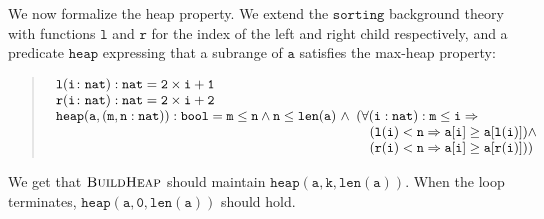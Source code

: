\documentclass[english,submission]{eptcs}
\begin{document}
We now formalize the heap property. We extend the $\mathtt{sorting}$
background theory with functions $\mathtt{l}$ and $\mathtt{r}$ for
the index of the left and right child respectively, and a predicate
$\mathtt{heap}$ expressing that a subrange of $\mathtt{a}$ satisfies
the max-heap property:
\begin{quote}
$\begin{array}[t]{l}
\mathtt{l(i\colon nat):nat=2\times i+1}\\
\mathtt{r(i\colon nat):nat=2\times i+2}\\
\mathtt{heap(a,(m,n:nat)):bool=m\le n\land n\le len(a)\ \land}\begin{array}[t]{l}
(\mathtt{\forall(i:nat):m\le i\Rightarrow}\\
\quad\mathtt{(l(i)<n\Rightarrow a[i]\ge a[l(i)])\land}\\
\quad\mathtt{(r(i)<n\Rightarrow a[i]\ge a[r(i)])})
\end{array}
\end{array}$
\end{quote}
\noindent We get that $\textsc{BuildHeap}$ should maintain $\mathtt{heap(a,k,len(a))}$.
When the loop terminates, $\mathtt{heap(a,0,len(a))}$ should hold.
\end{document}
